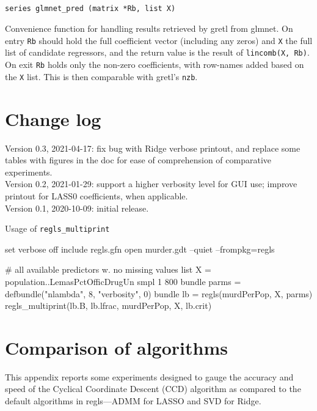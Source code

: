 \documentclass{article}
\newcommand{\startappendices}{%
\newcounter{appcount}
\setcounter{appcount}{0}
\renewcommand{\thesection}{Appendix \Alph{appcount}}}
\newcommand{\myappendix}[1]{%
\addtocounter{appcount}{1}
\section{#1}}
\newenvironment{funcdoc}
{\noindent\hrulefill\\[-12pt]}
{\medbreak}
\begin{document}
\begin{funcdoc}
\begin{verbatim}
series glmnet_pred (matrix *Rb, list X)
\end{verbatim}
  Convenience function for handling results retrieved by gretl from
  \textsf{glmnet}. On entry \texttt{Rb} should hold the full
  coefficient vector (including any zeros) and \texttt{X} the full
  list of candidate regressors, and the return value is the result of
  \texttt{lincomb(X, Rb)}. On exit \texttt{Rb} holds only the non-zero
  coefficients, with row-names added based on the \texttt{X}
  list. This is then comparable with gretl's \texttt{nzb}.
\end{funcdoc}

\section{Change log}
\label{sec:changes}

Version 0.3, 2021-04-17: fix bug with Ridge verbose printout, and
replace some tables with figures in the doc for ease of comprehension
of comparative experiments.\\
Version 0.2, 2021-01-29: support a higher verbosity level for GUI use;
improve printout for LASS0 coefficients, when applicable.\\
Version 0.1, 2020-10-09: initial release.

\begin{script}
  \caption{Usage of \texttt{regls\_multiprint}}
  \label{script:multiprint}
\begin{scode}
set verbose off
include regls.gfn
open murder.gdt --quiet --frompkg=regls

# all available predictors w. no missing values
list X = population..LemasPctOfficDrugUn
smpl 1 800
bundle parms = defbundle("nlambda", 8, "verbosity", 0)
bundle lb = regls(murdPerPop, X, parms)
regls_multiprint(lb.B, lb.lfrac, murdPerPop, X, lb.crit)
\end{scode}
  \end{script}




\clearpage
\startappendices

\myappendix{Comparison of algorithms}
\label{app:ccd}

This appendix reports some experiments designed to gauge the accuracy
and speed of the Cyclical Coordinate Descent (CCD) algorithm as
compared to the default algorithms in \textsf{regls}---ADMM for LASSO
and SVD for Ridge.
\end{document}
